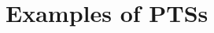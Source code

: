 \documentclass[oneside,a4paper]{article}
\theoremstyle{break}
\renewcommand{\arraystretch}{2.5}
\begin{document}
\section{Examples of PTSs}\label{sec:example}

\begin{enumerate}[(i)]

\begin{comment}
\item The $\lambda$-cube (Table~\ref{tab:lambda}) consists of eight
  PTSs, where

  \begin{enumerate}
  \item $\mathcal{S} = \{\star,\square\}$
  \item $\mathcal{A} = \{(\star, \square)\}$
  \item
    $\{(\star, \star)\} \subseteq \mathcal{R} \subseteq \{(\star,
    \star), (\star, \square), (\square, \star), (\square, \square)\}$
  \end{enumerate}


\begingroup
\renewcommand*{\arraystretch}{1.5}
\begin{table}[h!]
  \centering
  \begin{tabular}{|l|llll|}
    \hline
    System & \multicolumn{4}{|c|}{Set of Rules $\mathcal{R}$} \\ \hline
    $\lambda_{\rightarrow}$ & $(\star, \star)$ & & & \\
    $\lambda2$ & $(\star, \star)$ & $(\square, \star)$ & & \\ 
    $\lambda\underbar{$\omega$}$ & $(\star, \star)$ & &  $(\square, \square)$ & \\ 
    $\lambda\omega$ & $(\star, \star)$ & $(\square, \star)$ & $(\square, \square)$ & \\ 
    $\lambda$P & $(\star, \star)$ & & & $(\star, \square)$ \\ 
    $\lambda$P2 & $(\star, \star)$ & $(\square, \star)$ & & $(\star, \square)$ \\ 
    $\lambda$P$\underbar{$\omega$}$ & $(\star, \star)$ & & $(\square, \square)$ & $(\star, \square)$ \\ 
    $\lambda$C & $(\star, \star)$ & $(\square, \star)$ & $(\square, \square)$ & $(\star, \square)$ \\ \hline
  \end{tabular}
  \caption{The systems of the $\lambda$-cube}
  \label{tab:lambda}
\end{table}
\endgroup

Note that here we slightly abuse the notation of the set of rules
$\mathcal{R}$, since in PTSs, $\mathcal{R}$ is a ternary relation,
while in the $\lambda$-cube, $\mathcal{R}$ is a binary relation
($\Pi x: A.\ B$ has the same sorts as $B$).
\end{comment}


\end{enumerate}
\end{document}
